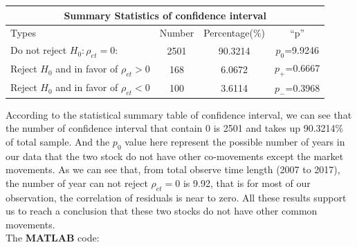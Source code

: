 \documentclass[12pt,letterpaper]{article}
\begin{document}
\begin{enumerate}[label=\textbf{(\Alph*)}]
\begin{table}[ht]
\centering %
\begin{tabular}{lccc} %
\hline\hline %
\multicolumn{4}{c}{Summary Statistics of confidence interval}\\ [0.5ex]%
\hline Types & Number & Percentage(\%) & ``p''\\
\hline
Do not reject $H_0:\rho_{et}{=}0$: & 2501 & 90.3214 & $p_0$=9.9246\\
Reject $H_0$ and in favor of $\rho_{et}>0$ & 168 & 6.0672 & $p_+$=0.6667\\
Reject $H_0$ and in favor of $\rho_{et}<0$ & 100 & 3.6114 & $p_-$=0.3968 \\
\hline %
\end{tabular}
\end{table}

According to the statistical summary table of confidence interval, we can see that the number of confidence interval that contain 0 is 2501 and takes up 90.3214\% of total sample. And the $p_0$ value here represent the possible number of years in our data that the two stock do not have other co-movements except the market movements. As we can see that, from total observe time length (2007 to 2017), the number of year can not reject $\rho_{et}=0$ is 9.92, that is for most of our observation, the correlation of residuals is near to zero. All these results support us to reach a conclusion that these two stocks do not have other common movements. \\



The \textbf{MATLAB} code:
   
\end{enumerate}
\newpage
\end{document}
